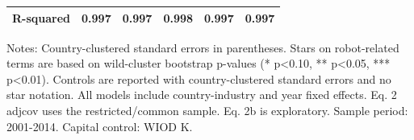 \begin{table}[!htbp]
\begin{threeparttable}
\begin{tabular}{lccccc}
R-squared & 0.997 & 0.997 & 0.998 & 0.997 & 0.997 \\
\bottomrule
\end{tabular}
\begin{tablenotes}[flushleft]
\footnotesize
\item Notes: Country-clustered standard errors in parentheses. Stars on robot-related terms are based on wild-cluster bootstrap p-values (* p<0.10, ** p<0.05, *** p<0.01). Controls are reported with country-clustered standard errors and no star notation. All models include country-industry and year fixed effects. Eq. 2 adjcov uses the restricted/common sample. Eq. 2b is exploratory. Sample period: 2001-2014. Capital control: WIOD K.
\end{tablenotes}
\end{threeparttable}
\end{table}
